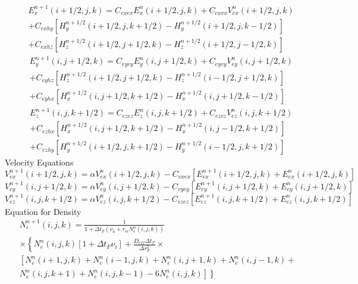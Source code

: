 \documentclass[a4paper,10pt]{article}
\begin{document}
\begin{eqnarray}
&& E_{x}^{n+1}(i+1/2,j,k)=C_{exex} E_{x}^{n}(i+1/2,j,k)+C_{exvx} V_{ex}^{n}(i+1/2,j,k)\nonumber\\
&& +C_{exhy}\left[H_{y}^{n+1/2}(i+1/2,j,k+1/2)-H_{y}^{n+1/2}(i+1/2,j,k-1/2)\right]\nonumber\\
&& +C_{exhz}\left[H_{z}^{n+1/2}(i+1/2,j+1/2,k)-H_{z}^{n+1/2}(i+1/2,j-1/2,k)\right]
\end{eqnarray}
\begin{eqnarray}
&& E_{y}^{n+1}(i,j+1/2,k)=C_{eyey} E_{y}^{n}(i,j+1/2,k)+C_{eyvy} V_{ey}^{n}(i,j+1/2,k)\nonumber\\
&& +C_{eyhz}\left[H_{z}^{n+1/2}(i+1/2,j+1/2,k)-H_{z}^{n+1/2}(i-1/2,j+1/2,k)\right]\nonumber\\
&& +C_{eyhx}\left[H_{x}^{n+1/2}(i,j+1/2,k+1/2)-H_{x}^{n+1/2}(i,j+1/2,k-1/2)\right]
\end{eqnarray}
\begin{eqnarray}
&& E_{z}^{n+1}(i,j,k+1/2)=C_{ezez} E_{z}^{n}(i,j,k+1/2)+C_{ezvz} V_{ez}^{n}(i,j,k+1/2)\nonumber\\
&& +C_{ezhx}\left[H_{x}^{n+1/2}(i,j+1/2,k+1/2)-H_{x}^{n+1/2}(i,j-1/2,k+1/2)\right]\nonumber\\
&& +C_{ezhy}\left[H_{y}^{n+1/2}(i+1/2,j,k+1/2)-H_{y}^{n+1/2}(i-1/2,j,k+1/2)\right]
\end{eqnarray}
Velocity Equations
\begin{equation}
V_{ex}^{n+1}(i+1/2,j,k)=\alpha V_{ex}^{n}(i+1/2,j,k)-C_{vxex}\left[E_{ex}^{n+1}(i+1/2,j,k)+E_{ex}^{n}(i+1/2,j,k)\right]
\end{equation}
\begin{equation}
V_{ey}^{n+1}(i,j+1/2,k)=\alpha V_{ey}^{n}(i,j+1/2,k)-C_{vyey}\left[E_{ey}^{n+1}(i,j+1/2,k)+E_{ey}^{n}(i,j+1/2,k)\right]
\end{equation}
\begin{equation}
V_{ez}^{n+1}(i,j,k+1/2)=\alpha V_{ez}^{n}(i,j,k+1/2)-C_{vzez}\left[E_{ez}^{n+1}(i,j,k+1/2)+E_{ez}^{n}(i,j,k+1/2)\right]
\end{equation}
Equation for Density
\begin{equation}
\begin{aligned}
& N^{n+1}_{e}(i,j,k)=\frac{1}{1+\Delta t_{F}(\nu_{a}+r_{ei}N^{n}_{e}(i,j,k))} \\
& \times \left\lbrace N^{n}_{e}(i,j,k)\left[1+\Delta t_{F} \nu_{i}\right]+\frac{D_{eff}\Delta t_{F}}{\Delta s^{2}_{F}}  \times \right. \\
& \left. \left[ N^{n}_{e}(i+1,j,k)+N^{n}_{e}(i-1,j,k)+
N^{n}_{e}(i,j+1,k)+N^{n}_{e}(i,j-1,k)+\right.\right. \\
& \left. \left.
N^{n}_{e}(i,j,k+1)+N^{n}_{e}(i,j,k-1)-6N^{n}_{e}(i,j,k)\right]
\right\rbrace \\
\end{aligned}
\end{equation}
\end{document}

